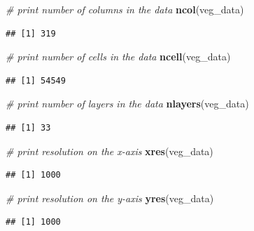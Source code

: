 \documentclass[12pt,]{book}
\newenvironment{Shaded}{\begin{snugshade}}{\end{snugshade}}
\newcommand{\KeywordTok}[1]{\textcolor[rgb]{0.13,0.29,0.53}{\textbf{#1}}}
\newcommand{\CommentTok}[1]{\textcolor[rgb]{0.56,0.35,0.01}{\textit{#1}}}
\newcommand{\NormalTok}[1]{#1}
\begin{document}
\begin{Shaded}
\begin{Highlighting}[]
\CommentTok{# print number of columns  in the data}
\KeywordTok{ncol}\NormalTok{(veg_data)}
\end{Highlighting}
\end{Shaded}

\begin{verbatim}
## [1] 319
\end{verbatim}

\begin{Shaded}
\begin{Highlighting}[]
\CommentTok{# print number of cells in the data}
\KeywordTok{ncell}\NormalTok{(veg_data)}
\end{Highlighting}
\end{Shaded}

\begin{verbatim}
## [1] 54549
\end{verbatim}

\begin{Shaded}
\begin{Highlighting}[]
\CommentTok{# print number of layers in the data}
\KeywordTok{nlayers}\NormalTok{(veg_data)}
\end{Highlighting}
\end{Shaded}

\begin{verbatim}
## [1] 33
\end{verbatim}

\begin{Shaded}
\begin{Highlighting}[]
\CommentTok{# print  resolution on the x-axis}
\KeywordTok{xres}\NormalTok{(veg_data)}
\end{Highlighting}
\end{Shaded}

\begin{verbatim}
## [1] 1000
\end{verbatim}

\begin{Shaded}
\begin{Highlighting}[]
\CommentTok{# print resolution on the y-axis}
\KeywordTok{yres}\NormalTok{(veg_data)}
\end{Highlighting}
\end{Shaded}

\begin{verbatim}
## [1] 1000
\end{verbatim}
\end{document}
